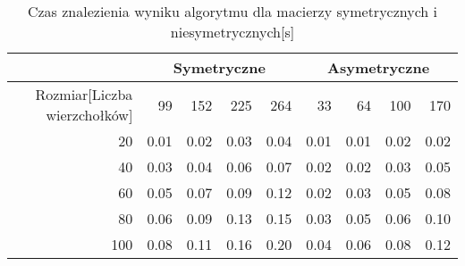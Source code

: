 \begin{table}
\begin{tabular}{|r|r|r|r|r|r|r|r|r|}
\hline
 & \multicolumn{4}{|c|}{Symetryczne} & \multicolumn{4}{|c|}{Asymetryczne} \\ \hline\
Rozmiar[Liczba wierzchołków] & 99 & 152 & 225 & 264 & 33 & 64 & 100 & 170 \\ \hline
20 & 0.01 & 0.02 & 0.03 & 0.04 & 0.01 & 0.01 & 0.02 & 0.02 \\
40 & 0.03 & 0.04 & 0.06 & 0.07 & 0.02 & 0.02 & 0.03 & 0.05 \\
60 & 0.05 & 0.07 & 0.09 & 0.12 & 0.02 & 0.03 & 0.05 & 0.08 \\
80 & 0.06 & 0.09 & 0.13 & 0.15 & 0.03 & 0.05 & 0.06 & 0.10 \\
100 & 0.08 & 0.11 & 0.16 & 0.20 & 0.04 & 0.06 & 0.08 & 0.12 \\ \hline
\end{tabular}
\caption{Czas znalezienia wyniku algorytmu dla macierzy symetrycznych i niesymetrycznych[s]}
\label{tab:time_AnEpoch}
\end{table}
